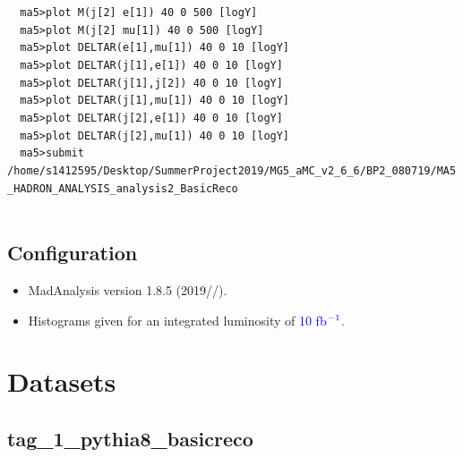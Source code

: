 \documentclass[a4paper, 10pt]{article}
\begin{document}
\texttt{ }\texttt{ }\texttt{ma5>plot M(j[2] e[1]) 40 0  500 [logY]\\
}
\texttt{ }\texttt{ }\texttt{ma5>plot M(j[2] mu[1]) 40 0  500 [logY]\\
}
\texttt{ }\texttt{ }\texttt{ma5>plot DELTAR(e[1],mu[1]) 40 0 10 [logY]\\
}
\texttt{ }\texttt{ }\texttt{ma5>plot DELTAR(j[1],e[1]) 40 0 10 [logY]\\
}
\texttt{ }\texttt{ }\texttt{ma5>plot DELTAR(j[1],j[2]) 40 0 10 [logY]\\
}
\texttt{ }\texttt{ }\texttt{ma5>plot DELTAR(j[1],mu[1]) 40 0 10 [logY]\\
}
\texttt{ }\texttt{ }\texttt{ma5>plot DELTAR(j[2],e[1]) 40 0 10 [logY]\\
}
\texttt{ }\texttt{ }\texttt{ma5>plot DELTAR(j[2],mu[1]) 40 0 10 [logY]\\
}
\texttt{ }\texttt{ }\texttt{ma5>submit /\-home/\-s1412595/\-Desktop/\-SummerProject2019/\-MG5\_aMC\_v2\_6\_6/\-BP2\_080719/\-MA5\_HADRON\_ANALYSIS\_analysis2\_BasicReco\\
}
\texttt{ }\texttt{ }\subsection{ Configuration}

\begin{itemize}
  \item MadAnalysis version 1.8.5 (2019//).
   \item Histograms given for an integrated luminosity of \textcolor{blue}{10}\textcolor{blue}{ fb}$^{\textcolor{blue}{-1}}$\textcolor{blue}{.}
\textcolor{blue}{}
\end{itemize}
\newpage
\section{ Datasets}

\subsection{ tag\_1\_pythia8\_basicreco}
\end{document}
